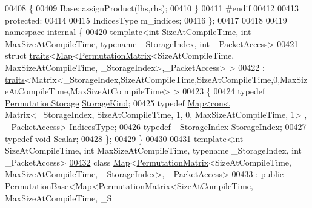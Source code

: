 \begin{DoxyCode}
00408     \{
00409       Base::assignProduct(lhs,rhs);
00410     \}
00411 \textcolor{preprocessor}{#endif}
00412 
00413   \textcolor{keyword}{protected}:
00414 
00415     IndicesType m\_indices;
00416 \};
00417 
00418 
00419 \textcolor{keyword}{namespace }\hyperlink{namespaceinternal}{internal} \{
00420 \textcolor{keyword}{template}<\textcolor{keywordtype}{int} SizeAtCompileTime, \textcolor{keywordtype}{int} MaxSizeAtCompileTime, \textcolor{keyword}{typename} \_StorageIndex, \textcolor{keywordtype}{int} \_PacketAccess>
\hyperlink{struct_eigen_1_1internal_1_1traits_3_01_map_3_01_permutation_matrix_3_01_size_at_compile_time_0013e0044a37b24d59a079ebbe4c707a56}{00421} \textcolor{keyword}{struct }\hyperlink{struct_eigen_1_1internal_1_1traits}{traits}<\hyperlink{group___core___module_class_eigen_1_1_map}{Map}<\hyperlink{group___core___module_class_eigen_1_1_permutation_matrix}{PermutationMatrix}<SizeAtCompileTime, MaxSizeAtCompileTime, 
      \_StorageIndex>,\_PacketAccess> >
00422  : \hyperlink{struct_eigen_1_1internal_1_1traits}{traits}<Matrix<\_StorageIndex,SizeAtCompileTime,SizeAtCompileTime,0,MaxSizeAtCompileTime,MaxSizeAtCo
      mpileTime> >
00423 \{
00424   \textcolor{keyword}{typedef} \hyperlink{struct_eigen_1_1_permutation_storage}{PermutationStorage} \hyperlink{struct_eigen_1_1_permutation_storage}{StorageKind};
00425   \textcolor{keyword}{typedef} 
      \hyperlink{group___core___module_class_eigen_1_1_map}{Map<const Matrix<\_StorageIndex, SizeAtCompileTime, 1, 0, MaxSizeAtCompileTime, 1>}
      , \_PacketAccess> \hyperlink{group___core___module_class_eigen_1_1_map}{IndicesType};
00426   \textcolor{keyword}{typedef} \_StorageIndex StorageIndex;
00427   \textcolor{keyword}{typedef} \textcolor{keywordtype}{void} Scalar;
00428 \};
00429 \}
00430 
00431 \textcolor{keyword}{template}<\textcolor{keywordtype}{int} SizeAtCompileTime, \textcolor{keywordtype}{int} MaxSizeAtCompileTime, \textcolor{keyword}{typename} \_StorageIndex, \textcolor{keywordtype}{int} \_PacketAccess>
\hyperlink{class_eigen_1_1_map_3_01_permutation_matrix_3_01_size_at_compile_time_00_01_max_size_at_compile_2f9d18bf0084dbfb13fbbfe14adaf22d}{00432} \textcolor{keyword}{class }\hyperlink{group___core___module_class_eigen_1_1_map}{Map}<\hyperlink{group___core___module_class_eigen_1_1_permutation_matrix}{PermutationMatrix}<SizeAtCompileTime, MaxSizeAtCompileTime, \_StorageIndex>,
      \_PacketAccess>
00433   : \textcolor{keyword}{public} \hyperlink{group___core___module_class_eigen_1_1_permutation_base}{PermutationBase}<Map<PermutationMatrix<SizeAtCompileTime, MaxSizeAtCompileTime, \_S

\end{DoxyCode}
